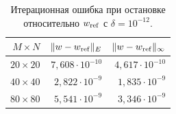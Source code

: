\begin{table}[H]
\centering\small
\caption{Итерационная ошибка при остановке относительно $w_{\rm ref}$ с $\delta=10^{-12}$.}
\begin{tabular}{rrr}
\toprule
$M\times N$ & $\|w-w_{\rm ref}\|_E$ & $\|w-w_{\rm ref}\|_\infty$ \\
\midrule
$20\times20$ & $7{,}608\cdot10^{-10}$ & $4{,}617\cdot10^{-10}$ \\
$40\times40$ & $2{,}822\cdot10^{-9}$ & $1{,}835\cdot10^{-9}$ \\
$80\times80$ & $5{,}541\cdot10^{-9}$ & $3{,}346\cdot10^{-9}$ \\
\bottomrule
\end{tabular}
\end{table}
